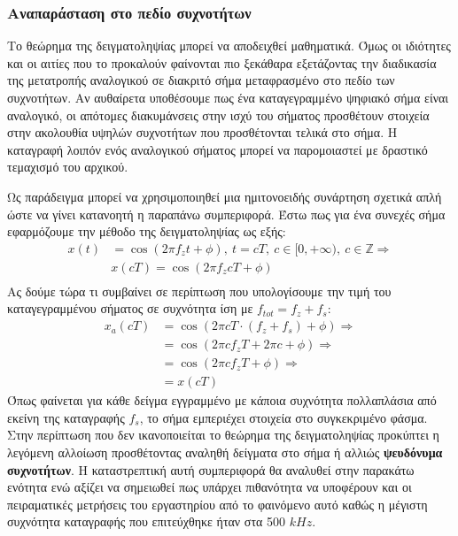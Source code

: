 \documentclass[breaklines=true, 12pt]{article}
\begin{document}
\subsubsection{Αναπαράσταση στο πεδίο συχνοτήτων}
\label{sec:orgd89fb14}
Το θεώρημα της δειγματοληψίας μπορεί να αποδειχθεί μαθηματικά. Όμως
οι ιδιότητες και οι αιτίες που το προκαλούν φαίνονται πιο ξεκάθαρα
εξετάζοντας την διαδικασία της μετατροπής αναλογικού σε διακριτό σήμα
μεταφρασμένο στο πεδίο των συχνοτήτων. Αν αυθαίρετα υποθέσουμε πως ένα
καταγεγραμμένο ψηφιακό σήμα είναι αναλογικό, οι απότομες διακυμάνσεις
στην ισχύ του σήματος προσθέτουν στοιχεία στην ακολουθία υψηλών
συχνοτήτων που προσθέτονται τελικά στο σήμα. Η καταγραφή λοιπόν ενός
αναλογικού σήματος μπορεί να παρομοιαστεί με δραστικό τεμαχισμό του
αρχικού.

Ως παράδειγμα μπορεί να χρησιμοποιηθεί μια ημιτονοειδής συνάρτηση
σχετικά απλή ώστε να γίνει κατανοητή η παραπάνω συμπεριφορά. Έστω
πως για ένα συνεχές σήμα εφαρμόζουμε την μέθοδο της δειγματοληψίας
ως εξής:
\begin{equation}
\begin{align}
x(t)&=\cos(2 \pi f_{z}t + \phi),\ t=cT,\ c \in [0, +\infty),\ c \in \mathbb{Z} \Rightarrow \\
&x(cT) = \cos(2 \pi f_{z} cT + \phi) \\
\end{align}
\end{equation}
Ας δούμε τώρα τι συμβαίνει σε περίπτωση που υπολογίσουμε την τιμή
του καταγεγραμμένου σήματος σε συχνότητα ίση με \(f_{tot} = f_{z}+f_{s}\):
\begin{equation}
\begin{align}
x_{a}(cT) &= \cos(2 \pi cT \cdot (f_{z}+f_{s})+ \phi) \Rightarrow \\
&= \cos(2 \pi cf_{z}T + 2 \pi c + \phi) \Rightarrow \\
&= \cos(2 \pi cf_{z}T + \phi) \Rightarrow \\
&= x(cT)
\end{align}
\end{equation}
Όπως φαίνεται για κάθε δείγμα εγγραμμένο με κάποια συχνότητα
πολλαπλάσια από εκείνη της καταγραφής \(f_{s}\), το σήμα εμπεριέχει στοιχεία
στο συγκεκριμένο φάσμα. Στην περίπτωση που δεν ικανοποιείται το θεώρημα
της δειγματοληψίας προκύπτει η λεγόμενη αλλοίωση προσθέτοντας αναληθή
δείγματα στο σήμα ή αλλιώς \textbf{ψευδόνυμα συχνοτήτων}. Η καταστρεπτική αυτή
συμπεριφορά θα αναλυθεί στην παρακάτω ενότητα ενώ αξίζει να σημειωθεί
πως υπάρχει πιθανότητα να υποφέρουν και οι πειραματικές μετρήσεις του
εργαστηρίου από το φαινόμενο αυτό καθώς η μέγιστη συχνότητα καταγραφής
που επιτεύχθηκε ήταν στα 500 \(kHz\).
\end{document}
